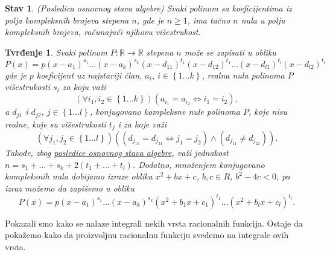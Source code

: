 \documentclass{article}
\newtheorem{stav}{Stav}[section]
\newtheorem{tvr}{Tvrđenje}[section]
\begin{document}
\begin{stavbox}
    \label{podsetnik_stava_1}
    \begin{stav}
        (Posledica osnovnog stava algebre) Svaki polinom sa koeficijentima iz polja kompleksnih brojeva
        stepena $n$, gde je $n\geq1$, ima tačno
        $n$ nula u polju kompleksnih brojeva, računajući njihovu višestrukost.
    \end{stav}
\end{stavbox}

\begin{tvrbox}
    \label{tvrđenje_1.1}
    \begin{tvr}
        Svaki polinom $P:\mathbb{R}\longrightarrow\mathbb{R}$ stepena $n$
        može se zapisati u obliku
        $$P\left(x\right)=p\left(x-a_1\right)^{s_1}\dotsc\left(x-a_k\right)^{s_k}\left(x-d_{11}\right)^{t_1}\left(x-d_{12}\right)^{t_1}\dotsc\left(x-d_{l1}\right)^{t_l}\left(x-d_{l2}\right)^{t_l}$$
        gde je $p$ koeficijent uz najstariji član,
        $a_i$, $i\in\left\{1\dotsc k\right\}$, realna nula polinoma $P$ višestrukosti $s_i$ za koju važi
        $$\left(\forall i_1,i_2\in\left\{1\dotsc k\right\}\right)\left(a_{i_1}=a_{i_2}\iff i_1=i_2\right),$$
        a $d_{j1}$ i $d_{j2}$,
        $j\in\left\{1\dotsc l\right\}$, konjugovano kompleksne nule polinoma $P$, koje nisu realne,
        koje su višestrukosti $t_j$ i za koje važi
        $$\left(\forall j_1,j_2\in\left\{1\dotsc l\right\}\right)\left(\left(d_{j_11}=d_{j_21}\iff j_1=j_2\right)\land\left(d_{j_11}\neq d_{j_22}\right)\right).$$
        Takođe, zbog \hyperref[podsetnik_stava_1]{posledice osnovnog stava algebre}, važi jednakost $n=s_1+\dotsc+s_k+2\left(t_1+\dotsc+t_l\right)$. Dodatno,
        množenjem konjugovano kompleksnih nula dobijamo izraze oblika $x^2+bx+c$, $b,c\in{R}$, $b^2-4c<0$,
        pa izraz možemo da zapišemo u obliku
        $$P\left(x\right)=p\left(x-a_1\right)^{s_1}\dotsc\left(x-a_k\right)^{s_k}\left(x^2+b_1x+c_1\right)^{t_1}\dotsc\left(x^2+b_lx+c_l\right)^{t_l}.$$
    \end{tvr}
\end{tvrbox}

Pokazali smo kako se nalaze integrali nekih vrsta
racionalnih funkcija. Ostaje da pokažemo kako da
proizvoljnu racionalnu funkciju svedemo na
integrale ovih vrsta.
\end{document}
